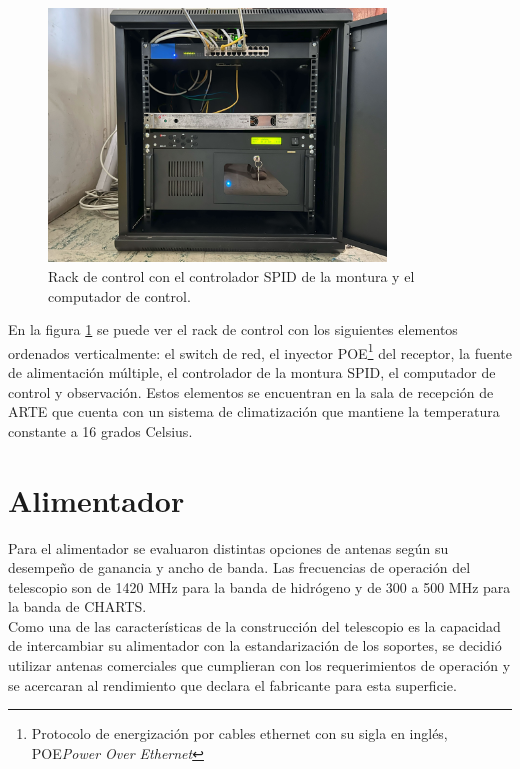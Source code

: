 \begin{figure}
    \centering
    \includegraphics[width=0.8\textwidth]{img/rack}
    \caption{Rack de control con el controlador SPID de la montura y el computador de control.}
    \label{fig:ensamble12}
\end{figure}

En la figura \ref{fig:ensamble12} se puede ver el rack de control con los siguientes elementos ordenados verticalmente: el switch de red, el inyector POE\footnote{Protocolo de energización por cables ethernet con su sigla en inglés, POE\textit{Power Over Ethernet}} del receptor, la fuente de alimentación múltiple, el controlador de la montura SPID, el computador de control y observación. Estos elementos se encuentran en la sala de recepción de ARTE que cuenta con un sistema de climatización que mantiene la temperatura constante a 16 grados Celsius.\\

\section{Alimentador}

Para el alimentador se evaluaron distintas opciones de antenas según su desempeño de ganancia y ancho de banda. Las frecuencias de operación del telescopio son de 1420 MHz para la banda de hidrógeno y de 300 a 500 MHz para la banda de CHARTS.\\

Como una de las características de la construcción del telescopio es la capacidad de intercambiar su alimentador con la estandarización de los soportes, se decidió utilizar antenas comerciales que cumplieran con los requerimientos de operación y se acercaran al rendimiento que declara el fabricante para esta superficie.\\

